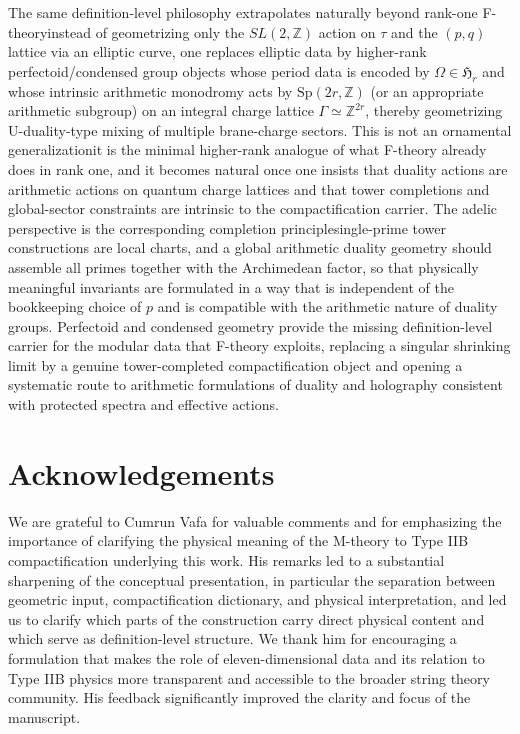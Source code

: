 \documentclass[11pt]{article}
\theoremstyle{remark}
\newcommand{\Z}{\mathbb{Z}}
\begin{document}
The same definition-level philosophy extrapolates naturally beyond rank-one F-theory\:instead of geometrizing only the \(SL(2,\Z)\) action on \(\tau\) and the \((p,q)\) lattice via an elliptic curve, one replaces elliptic data by higher-rank perfectoid/condensed group objects whose period data is encoded by \(\Omega\in\mathfrak{H}_{r}\) and whose intrinsic arithmetic monodromy acts by \(\mathrm{Sp}(2r,\Z)\) (or an appropriate arithmetic subgroup) on an integral charge lattice \(\Gamma\simeq\Z^{2r}\), thereby geometrizing U-duality-type mixing of multiple brane-charge sectors. This is not an ornamental generalization\:it is the minimal higher-rank analogue of what F-theory already does in rank one, and it becomes natural once one insists that duality actions are arithmetic actions on quantum charge lattices and that tower completions and global-sector constraints are intrinsic to the compactification carrier. The adelic perspective is the corresponding completion principle\:single-prime tower constructions are local charts, and a global arithmetic duality geometry should assemble all primes together with the Archimedean factor, so that physically meaningful invariants are formulated in a way that is independent of the bookkeeping choice of \(p\) and is compatible with the arithmetic nature of duality groups.
Perfectoid and condensed geometry provide the missing definition-level carrier for the modular data that F-theory exploits, replacing a singular shrinking limit by a genuine tower-completed compactification object and opening a systematic route to arithmetic formulations of duality and holography consistent with protected spectra and effective actions. 



\section*{Acknowledgements}
We are grateful to Cumrun Vafa for valuable comments and for emphasizing the importance of clarifying the physical meaning of the M-theory to Type IIB compactification underlying this work. His remarks led to a substantial sharpening of the conceptual presentation, in particular the separation between geometric input, compactification dictionary, and physical interpretation, and led us to clarify which parts of the construction carry direct physical content and which serve as definition-level structure. We thank him for encouraging a formulation that makes the role of eleven-dimensional data and its relation to Type IIB physics more transparent and accessible to the broader string theory community. His feedback significantly improved the clarity and focus of the manuscript.
\end{document}

